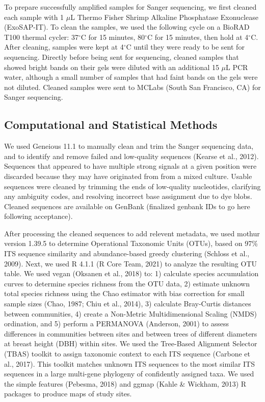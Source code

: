 \documentclass[fleqn,10pt,lineno]{wlpeerj} %
\begin{document}
To prepare successfully amplified samples for Sanger sequencing, we first cleaned each sample with 1 \(\mu\)L Thermo Fisher Shrimp Alkaline Phosphatase Exonuclease (ExoSAP-IT). To clean the samples, we used the following cycle on a BioRAD T100 thermal cycler: 37\(^{\circ}\)C for 15 minutes, 80\(^{\circ}\)C for 15 minutes, then hold at 4\(^{\circ}\)C. After cleaning, samples were kept at 4\(^{\circ}\)C until they were ready to be sent for sequencing. Directly before being sent for sequencing, cleaned samples that showed bright bands on their gels were diluted with an additional 15 \(\mu\)L PCR water, although a small number of samples that had faint bands on the gels were not diluted. Cleaned samples were sent to MCLabs (South San Francisco, CA) for Sanger sequencing.

\hypertarget{computational-and-statistical-methods}{%
\subsection*{Computational and Statistical Methods}\label{computational-and-statistical-methods}}

We used Geneious 11.1 to manually clean and trim the Sanger sequencing data, and to identify and remove failed and low-quality sequences (Kearse et al., 2012). Sequences that appeared to have multiple strong signals at a given position were discarded because they may have originated from from a mixed culture. Usable sequences were cleaned by trimming the ends of low-quality nucleotides, clarifying any ambiguity codes, and resolving incorrect base assignment due to dye blobs. Cleaned sequences are available on GenBank (finalized genbank IDs to go here following acceptance).

After processing the cleaned sequences to add relevent metadata, we used mothur version 1.39.5 to determine Operational Taxonomic Units (OTUs), based on 97\% ITS sequence similarity and abundance-based greedy clustering (Schloss et al., 2009). Next, we used R 4.1.1 (R Core Team, 2021) to analyze the resulting OTU table. We used vegan (Oksanen et al., 2018) to: 1) calculate species accumulation curves to determine species richness from the OTU data, 2) estimate unknown total species richness using the Chao estimator with bias correction for small sample sizes (Chao, 1987; Chiu et al., 2014), 3) calculate Bray-Curtis distances between communities, 4) create a Non-Metric Multidimensional Scaling (NMDS) ordination, and 5) perform a PERMANOVA (Anderson, 2001) to assess differences in communities between sites and between trees of different diameters at breast height (DBH) within sites. We used the Tree-Based Alignment Selector (TBAS) toolkit to assign taxonomic context to each ITS sequence (Carbone et al., 2017). This toolkit matches unknown ITS sequences to the most similar ITS sequences in a large multi-gene phylogeny of confidently assigned taxa. We used the simple features (Pebesma, 2018) and ggmap (Kahle \& Wickham, 2013) R packages to produce maps of study sites.
\end{document}
